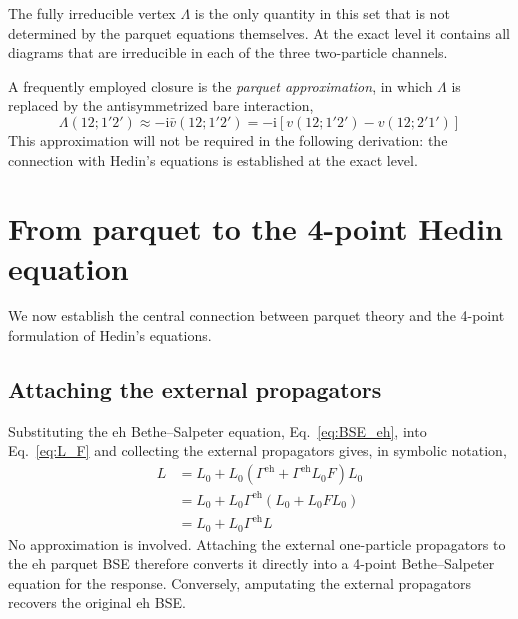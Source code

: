 \documentclass[aip,jcp,reprint,noshowkeys,superscriptaddress]{revtex4-1}
\newcommand{\ii}{\mathrm{i}}
\newcommand{\eh}{\text{eh}}
\begin{document}
The fully irreducible vertex $\Lambda$ is the only quantity in this set
that is not determined by the parquet equations themselves.
At the exact level it contains all diagrams that are irreducible in each
of the three two-particle channels.

A frequently employed closure is the \emph{parquet approximation}, in
which $\Lambda$ is replaced by the antisymmetrized bare interaction,
\begin{equation}
	\Lambda(12;1'2')
	\approx
	-\ii \bar v(12;1'2')
	=
	-\ii
	\left[
		v(12;1'2')
		-
		v(12;2'1')
	\right]
	\label{eq:parquet_approximation}
\end{equation}
This approximation will not be required in the following derivation:
the connection with Hedin's equations is established at the exact level.


\section{From parquet to the 4-point Hedin equation}
\label{sec:parquet_to_hedin4}

We now establish the central connection between parquet theory and the
4-point formulation of Hedin's equations.

\subsection{Attaching the external propagators}

Substituting the $\eh$ Bethe--Salpeter equation,
Eq.~\eqref{eq:BSE_eh}, into Eq.~\eqref{eq:L_F} and collecting the
external propagators gives, in symbolic notation,
\begin{equation}
\begin{split}
	L
	&=
	L_0
	+
	L_0\left(\Gamma^\eh+\Gamma^\eh L_0F\right)L_0
	\\
	&=
	L_0
	+
	L_0\Gamma^\eh\left(L_0+L_0FL_0\right)
	\\
	&=
	L_0
	+
	L_0\Gamma^\eh L
\end{split}
	\label{eq:L_BSE_Gammaeh}
\end{equation}
No approximation is involved.
Attaching the external one-particle propagators to the $\eh$ parquet BSE
therefore converts it directly into a 4-point Bethe--Salpeter equation
for the response.
Conversely, amputating the external propagators recovers the original
$\eh$ BSE.
\end{document}
